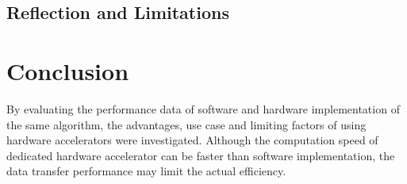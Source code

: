\documentclass[journal]{IEEEtran}
\begin{document}
\subsection{Reflection and Limitations}

\section{Conclusion}

By evaluating the performance data of software and hardware implementation of the same algorithm, the advantages, use case and limiting factors of using hardware accelerators were investigated. Although the computation speed of dedicated hardware accelerator can be faster than software implementation, the data transfer performance may limit the actual efficiency.




\end{document}

